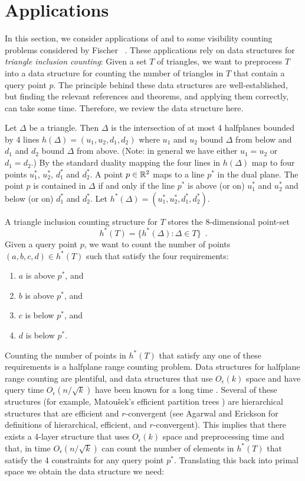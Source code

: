 \documentclass{patmorin}
\newcommand{\Oe}{O_\epsilon}
\begin{document}
\section{Applications}

In this section, we consider applications of  and
 to some visibility counting problems considered by Fischer
\etal\ \cite{fXX}.  These applications rely on data structures for
\emph{triangle inclusion counting}:  Given a set $T$ of triangles, we want
to preprocess $T$ into a data structure for counting the number of
triangles in $T$ that contain a query point $p$.  The principle behind
these data structures are well-established, but finding the relevant
references and theorems, and applying them correctly, can take some time.
Therefore, we review the data structure here.

Let $\Delta$ be a triangle. Then $\Delta$ is the intersection of at most 4
halfplanes bounded by 4 lines $h(\Delta)=(u_1,u_2,d_1,d_2)$ where $u_1$ and
$u_2$ bound $\Delta$ from below and $d_1$ and $d_2$ bound $\Delta$ from
above.  (Note: in general we have either $u_1=u_2$ or $d_1=d_2$.)  By the
standard duality mapping \cite{eXX} the four lines in $h(\Delta)$ map to
four points $u_1^*$, $u_2^*$, $d_1^*$ and $d_2^*$.  A point $p\in\mathbb{R}^2$ maps
to a line $p^*$ in the dual plane.  The point $p$ is contained in $\Delta$
if and only if the line $p^*$ is above (or on) $u_1^*$ and $u_2^*$ and
below (or on) $d_1^*$ and $d_2^*$.  Let $h^*(\Delta)=(u_1^*,u_2^*,d_1^*,d_2^*)$.

A triangle inclusion counting structure for $T$ stores the 8-dimensional
point-set
\[
    h^*(T) = \{ h^*(\Delta) : \Delta\in T \} \enspace .
\]
Given a query point $p$, we want to count the number of points
$(a,b,c,d)\in h^*(T)$ such that satisfy the four requirements:
\begin{enumerate}
  \item $a$ is above $p^*$, and
  \item $b$ is above $p^*$, and 
  \item $c$ is below $p^*$, and
  \item $d$ is below $p^*$.
\end{enumerate}
Counting the number of points in $h^*(T)$ that satisfy any one of these
requirements is a halfplane range counting problem.  Data structures
for halfplane range counting are plentiful, and data structures that use
$\Oe(k)$ space and have query time $\Oe(n/\sqrt{k})$ have been known for
a long time \cite{a,b,c,d}.  Several of these structures (for example,
Matou\v{s}ek's efficient partition trees \cite{mXX}) are hierarchical
structures that are efficient and $r$-convergent (see Agarwal and Erickson
\cite[Section~5]{aeXX} for definitions of hierarchical, efficient, and
$r$-convergent).  This implies \cite[Theorem~10]{aeXX} that there exists
a 4-layer structure that uses $\Oe(k)$ space and preprocessing time and
that, in time $\Oe(n/\sqrt{k})$ can count the number of elements
in $h^*(T)$ that satisfy the 4 constraints for any query point $p^*$.
Translating this back into primal space we obtain the data structure
we need:
\end{document}
